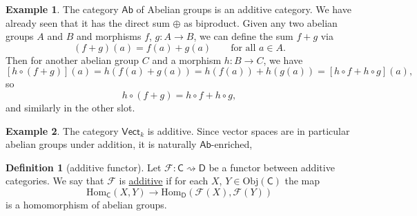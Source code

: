 \documentclass[a4paper,10pt]{scrreprt}
\newcommand{\defn}[1]{\ul{#1}}
\newcommand{\Obj}{\mathrm{Obj}}
\newcommand{\Hom}{\mathrm{Hom}}
\theoremstyle{definition}
\newtheorem{definition}{Definition}[section]
\newtheorem{example}{Example}[section]
\theoremstyle{plain}
\theoremstyle{remark}
\begin{document}
\begin{example}
  The category $\mathsf{Ab}$ of Abelian groups is an additive category. We have already seen that it has the direct sum $\oplus$ as biproduct. Given any two abelian groups $A$ and $B$ and morphisms $f$, $g\colon A \to B$, we can define the sum $f + g$ via
  \begin{equation*}
    (f + g)(a) = f(a) + g(a)\qquad\text{for all }a \in A.
  \end{equation*}
  Then for another abelian group $C$ and a morphism $h\colon B \to C$, we have
  \begin{equation*}
    \left[ h \circ (f+g) \right](a) = h(f(a) + g(a)) = h(f(a)) + h(g(a)) = \left[ h \circ f + h \circ g \right](a),
  \end{equation*}
  so 
  \begin{equation*}
    h \circ (f+g) =h \circ f + h \circ g,
  \end{equation*}
  and similarly in the other slot.
\end{example}

\begin{example}
  The category $\mathsf{Vect}_{k}$ is additive. Since vector spaces are in particular abelian groups under addition, it is naturally $\mathsf{Ab}$-enriched,
\end{example}

\begin{definition}[additive functor]
  \label{def:additivefunctor}
  Let $\mathcal{F}\colon \mathsf{C} \rightsquigarrow \mathsf{D}$ be a functor between additive categories. We say that $\mathcal{F}$ is \defn{additive} if for each $X$, $Y \in \Obj(\mathsf{C})$ the map
  \begin{equation*}
    \Hom_{\mathsf{C}}(X, Y) \to \Hom_{\mathsf{D}}(\mathcal{F}(X), \mathcal{F}(Y))
  \end{equation*}
  is a homomorphism of abelian groups.
\end{definition}
\end{document}
